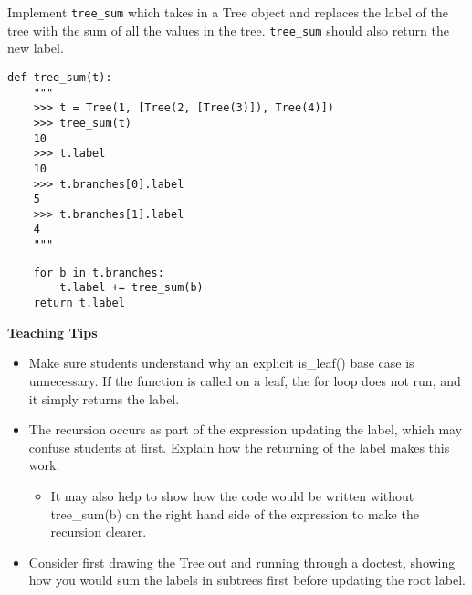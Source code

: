 \begin{blocksection}
\question Implement \lstinline$tree_sum$ which takes in a Tree
object and replaces the label of the tree with the sum of all the values
in the tree. \lstinline$tree_sum$ should also return the new label.

\begin{lstlisting}
def tree_sum(t):
    """
    >>> t = Tree(1, [Tree(2, [Tree(3)]), Tree(4)])
    >>> tree_sum(t)
    10
    >>> t.label
    10
    >>> t.branches[0].label
    5
    >>> t.branches[1].label
    4
    """
\end{lstlisting}

\begin{solution}[1in]
\begin{lstlisting}
    for b in t.branches:
        t.label += tree_sum(b)
    return t.label
\end{lstlisting}
\end{solution}
\end{blocksection}

\begin{guide}
    \textbf{Teaching Tips}
    \begin{itemize}
        \item Make sure students understand why an explicit is\_leaf() base case is unnecessary. If the function is called on a leaf, the for loop does not run, and it simply returns the label.
        \item The recursion occurs as part of the expression updating the label, which may confuse students at first. Explain how the returning of the label makes this work.
        \begin{itemize}
            \item It may also help to show how the code would be written without tree\_sum(b) on the right hand side of the expression to make the recursion clearer.
        \end{itemize}
        \item Consider first drawing the Tree out and running through a doctest, showing how you would sum the labels in subtrees first before updating the root label.
    \end{itemize}
\end{guide}
    
